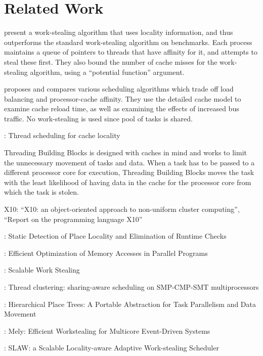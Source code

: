 
\chapter{Related Work}
\label{chap:locality-related-work}

\textcite{Acar2002} present a work-stealing algorithm that uses
locality information, and thus outperforms the standard work-stealing
algorithm on benchmarks. Each process maintains a queue of pointers to
threads that have affinity for it, and attempts to steal these
first. They also bound the number of cache misses for the
work-stealing algorithm, using a ``potential function'' argument.

\textcite{Squillante1993} proposes and compares various scheduling
algorithms which trade off load balancing and processor-cache
affinity. They use the detailed cache model to examine cache reload
time, as well as examining the effects of increased bus traffic. No
work-stealing is used since pool of tasks is shared.

\textcite{Philbin1996}: Thread scheduling for cache locality

Threading Building Blocks \cite{Contreras2008, Reinders2007} is
designed with caches in mind and works to limit the unnecessary
movement of tasks and data. When a task has to be passed to a
different processor core for execution, Threading Building Blocks
moves the task with the least likelihood of having data in the cache
for the processor core from which the task is stolen.

X10: \textcite{Charles2005} ``X10: an object-oriented approach to
non-uniform cluster computing'', \textcite{Saraswat2010} ``Report on
the programming language X10''

\textcite{Agarwal2008}: Static Detection of Place Locality and
Elimination of Runtime Checks

\textcite{Barik2009}: Efficient Optimization of Memory Accesses in
Parallel Programs

\textcite{Dinan2009}: Scalable Work Stealing

\textcite{Tam2007}: Thread clustering: sharing-aware scheduling on
SMP-CMP-SMT multiprocessors

\textcite{Yan2009}: Hierarchical Place Trees: A Portable Abstraction
for Task Parallelism and Data Movement

\textcite{Gaud2010}: Mely: Efficient Workstealing for Multicore
Event-Driven Systems \cite{Gaud2010}

\textcite{Guo2010}: SLAW: a Scalable Locality-aware Adaptive
Work-stealing Scheduler



